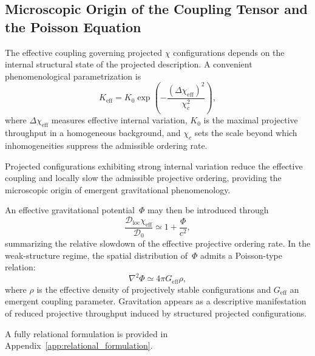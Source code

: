 \subsection{Microscopic Origin of the Coupling Tensor and the Poisson
Equation}
  \label{subsec:microscopic-origin-of-the-coupling-tensor-and-the-poisson-equation}

  The effective coupling governing projected $\chi$ configurations depends on
  the internal structural state of the projected description.
  A convenient phenomenological parametrization is
  \begin{equation}
    K_{\mathrm{eff}}
    = K_0 \exp\!\left(
                  -\frac{(\Delta \chi_{\mathrm{eff}})^2}{\chi_c^2}
    \right),
    \label{eq:effective_coupling_tensor}
  \end{equation}
  where $\Delta \chi_{\mathrm{eff}}$ measures effective internal variation,
  $K_0$ is the maximal projective throughput in a homogeneous background,
  and $\chi_c$ sets the scale beyond which inhomogeneities suppress the
  admissible ordering rate.

  Projected configurations exhibiting strong internal variation reduce the
  effective coupling and locally slow the admissible projective ordering,
  providing the microscopic origin of emergent gravitational phenomenology.

  An effective gravitational potential~$\Phi$ may then be introduced through
  \begin{equation}
    \frac{\mathcal{D}_{\mathrm{loc}} \chi_{\mathrm{eff}}}
    {\mathcal{D}_0}
    \simeq 1 + \frac{\Phi}{c^2},
    \label{eq:relaxation_potential_relation}
  \end{equation}
  summarizing the relative slowdown of the effective projective ordering rate.
  In the weak-structure regime, the spatial distribution of~$\Phi$ admits a
  Poisson-type relation:
  \begin{equation}
    \nabla^2 \Phi \simeq 4\pi G_{\mathrm{eff}} \rho,
    \label{eq:effective_poisson_equation}
  \end{equation}
  where $\rho$ is the effective density of projectively stable configurations
  and $G_{\mathrm{eff}}$ an emergent coupling parameter.
  Gravitation appears as a descriptive manifestation of reduced projective
  throughput induced by structured projected configurations.

  A fully relational formulation is provided in
  Appendix~\ref{app:relational_formulation}.
